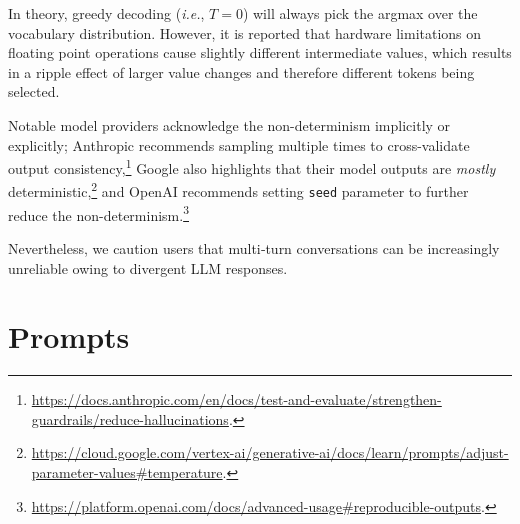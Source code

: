 \documentclass{article}
\begin{document}
\begin{appendices}
In theory, greedy decoding (\textit{i.e.}, $T=0$) will always pick the argmax over the vocabulary distribution.
However, it is reported that hardware limitations on floating point operations cause slightly different intermediate values, which results in a ripple effect of larger value changes and therefore different tokens being selected.

Notable model providers acknowledge the non-determinism implicitly or explicitly; Anthropic recommends sampling multiple times to cross-validate output consistency,\footnote{\url{https://docs.anthropic.com/en/docs/test-and-evaluate/strengthen-guardrails/reduce-hallucinations}.} Google also highlights that their model outputs are \textit{mostly} deterministic,\footnote{\url{https://cloud.google.com/vertex-ai/generative-ai/docs/learn/prompts/adjust-parameter-values\#temperature}.} and OpenAI recommends setting \texttt{seed} parameter to further reduce the non-determinism.\footnote{\url{https://platform.openai.com/docs/advanced-usage\#reproducible-outputs}.}

Nevertheless, we caution users that multi‑turn conversations can be increasingly unreliable owing to divergent LLM responses.

\newpage
\section{Prompts}\label{app:prompts}


\end{appendices}
\end{document}
